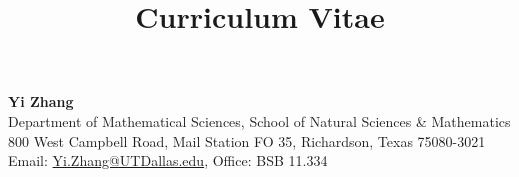 \documentclass[a4paper,12pt]{article}
\title{\bf{\Huge{Curriculum Vitae}}}
\author{}
\date{}
\begin{document}
\maketitle
\thispagestyle{empty}

\begin{center}
    \textbf{Yi Zhang} \\
    Department of Mathematical Sciences, School of Natural Sciences \& Mathematics \\
    800 West Campbell Road, Mail Station FO 35, Richardson, Texas 75080-3021 \\
    Email: \href{mailto:Yi.Zhang@UTDallas.edu}{Yi.Zhang@UTDallas.edu}, Office:  BSB 11.334
 \end{center}



\end{document}
